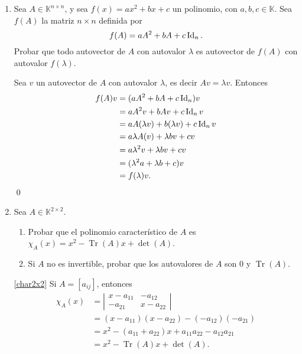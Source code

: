 \begin{enumerate}[resume,topsep=6pt,itemsep=.4cm]
    Por otro lado, $w = 2-z$ y por lo tanto $-2z+2-z=1$, es decir $-3z=-1$ $\Rightarrow$ $z = 1/3$, y  en consecuencia $w =2-z = 2- 1/3=5/3$.

    Luego, la matriz buscada es 
    $$
    A = \begin{bmatrix} 4/3 & 2/3\\1/3  & 5/3 \end{bmatrix}.
    $$

    \qed
    
    
    \item Sea $A\in\mathbb{K}^{n\times n}$, y sea $f(x) = ax^2+bx+c$ un polinomio, con $a,b,c\in\mathbb{K}$. Sea $f(A)$ la matriz $n \times n$ definida por
    $$f(A) = a A^2+bA+c\operatorname{Id}_n.$$
    Probar que todo autovector de $A$ con autovalor $\lambda$ es autovector de $f(A)$ con autovalor $f(\lambda)$.
    
    \rta Sea $v$ un autovector de $A$ con autovalor $\lambda$, es decir $Av=\lambda v$. Entonces 
    \begin{align*}
        f(A)v &= (a A^2+bA+c\operatorname{Id}_n)v \\
        &= a A^2v+bAv+c\operatorname{Id}_nv \\
        &= a A(\lambda v)+b(\lambda v)+c\operatorname{Id}_n v \\
        &=  a \lambda A(v)+\lambda bv+c v \\
        &=a \lambda^2 v+\lambda bv+c v \\
        &= (\lambda^2 a+\lambda b+c)v \\
        &= f(\lambda)v.
    \end{align*}
    \qed

        
    \item Sea $A\in\mathbb{K}^{2\times 2}$.
    
        \begin{enumerate}     
            \item\label{char2x2} Probar que el polinomio característico de $A$ es \ $\chi_A(x) = x^2-\operatorname{Tr}(A)x+\det(A)$.
            \item\label{no_inv2x2} Si $A$ no es invertible, probar que los autovalores de  $A$ son $0$ y $\operatorname{Tr}(A)$.
        \end{enumerate}
    
    \rta 
    
    \ref{char2x2} Si $A= [a_{ij}]$, entonces
    \begin{align*}
        \chi_A(x) &= \left|\begin{matrix} x-a_{11} & -a_{12}\\ -a_{21} & x-a_{22} \end{matrix} \right| \\ &= (x-a_{11})(x-a_{22})-(-a_{12})(-a_{21})\\& = x^2-(a_{11}+a_{22})x+a_{11}a_{22}-a_{12}a_{21} \\
        &= x^2-\operatorname{Tr}(A)x+\det(A).
    \end{align*}


\end{enumerate}

